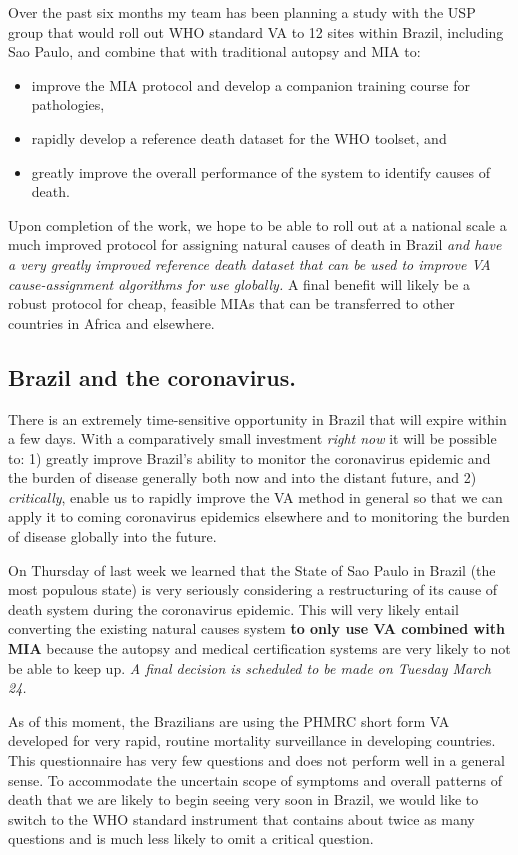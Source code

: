 \documentclass[12pt]{article}
\begin{document}
Over the past six months my team has been planning a study with the USP group that would roll out WHO standard VA to 12 sites within Brazil, including Sao Paulo, and combine that with traditional autopsy and MIA to:
\begin{itemize}
\item improve the MIA protocol and develop a companion training course for pathologies,
\item rapidly develop a reference death dataset for the WHO toolset, and
\item greatly improve the overall performance of the system to identify causes of death.
\end{itemize}
Upon completion of the work, we hope to be able to roll out at a national scale a much improved protocol for assigning natural causes of death in Brazil \textit{and have a very greatly improved reference death dataset that can be used to improve VA cause-assignment algorithms for use globally.}  A final benefit will likely be a robust protocol for cheap, feasible MIAs that can be transferred to other countries in Africa and elsewhere.

\subsection{Brazil and the coronavirus.}

There is an extremely time-sensitive opportunity in Brazil that will expire within a few days.  With a comparatively small investment \textit{right now} it will be possible to: 1) greatly improve Brazil's ability to monitor the coronavirus epidemic and the burden of disease generally both now and into the distant future, and 2) \textit{critically}, enable us to rapidly improve the VA method in general so that we can apply it to coming coronavirus epidemics elsewhere and to monitoring the burden of disease globally into the future.  

On Thursday of last week we learned that the State of Sao Paulo in Brazil (the most populous state) is very seriously considering a restructuring of its cause of death system during the coronavirus epidemic.  This will very likely entail converting the existing natural causes system \textbf{to only use VA combined with MIA} because the autopsy and medical certification systems are very likely to not be able to keep up.  \textit{A final decision is scheduled to be made on Tuesday March 24.}  

As of this moment, the Brazilians are using the PHMRC short form VA developed for very rapid, routine mortality surveillance in developing countries. This questionnaire has very few questions and does not perform well in a general sense. To accommodate the uncertain scope of symptoms and overall patterns of death that we are likely to begin seeing very soon in Brazil, we would like to switch to the WHO standard instrument that contains about twice as many questions and is much less likely to omit a critical question. 
\end{document}
